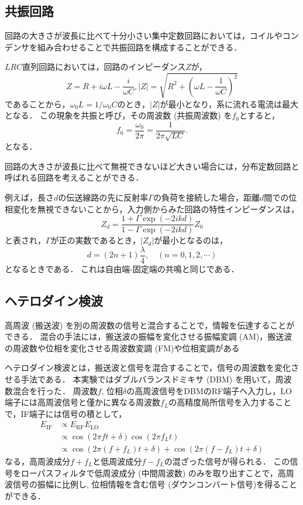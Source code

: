 \documentclass[uplatex,dvipdfmx,a4j,12pt]{jsarticle}
\begin{document}
\subsection{共振回路}
回路の大きさが波長に比べて十分小さい集中定数回路においては，コイルやコンデンサを組み合わせることで共振回路を構成することができる．

$LRC$直列回路においては，回路のインピーダンス$Z$が，
\begin{equation}
  Z = R + i\omega L - \frac{i}{\omega C}, |Z| = \sqrt{R^2 + \left(\omega L - \frac{1}{\omega C}\right)^2}
\end{equation}
であることから，$\omega_0 L = 1/\omega_0 C$のとき，$|Z|$が最小となり，系に流れる電流は最大となる．
この現象を共振と呼び，その周波数 (共振周波数) を$f_0$とすると，
\begin{equation}
  f_0 = \frac{\omega_0}{2\pi} = \frac{1}{2\pi\sqrt{LC}}.\label{eq:resonance_frequency}
\end{equation}
となる．

回路の大きさが波長に比べて無視できないほど大きい場合には，分布定数回路と呼ばれる回路を考えることができる．

例えば，長さ$d$の伝送線路の先に反射率$\Gamma$の負荷を接続した場合，距離$d$間での位相変化を無視できないことから，入力側からみた回路の特性インピーダンスは，
\begin{equation}
  Z_d = \frac{1+\Gamma \exp{(-2ikd)}}{1-\Gamma \exp{(-2ikd)}}Z_0
\end{equation}
と表され，$\Gamma$が正の実数であるとき，$|Z_d|$が最小となるのは，
\begin{equation}
  d = (2n + 1)\frac{\lambda}{4}, \quad (n = 0, 1, 2, \cdots)\label{eq:resonance_length}
\end{equation}
となるときである．
これは自由端-固定端の共鳴と同じである．

\subsection{ヘテロダイン検波}
高周波 (搬送波) を別の周波数の信号と混合することで，情報を伝達することができる．
混合の手法には，搬送波の振幅を変化させる振幅変調 (AM)，搬送波の周波数や位相を変化させる周波数変調 (FM)や位相変調がある

ヘテロダイン検波とは，搬送波と信号を混合することで，信号の周波数を変化させる手法である．
本実験ではダブルバランスドミキサ (DBM) を用いて，周波数混合を行った．
周波数$f$, 位相$\delta$の高周波信号をDBMのRF端子へ入力し，LO端子には高周波信号と僅かに異なる周波数$f_L$の高精度局所信号を入力することで，IF端子には信号の積として，
\begin{align}
  E_\mathrm{IF} &\propto E_\mathrm{RF} E_\mathrm{LO} \nonumber \\
  &\propto \cos\left(2\pi f t + \delta\right) \cos\left(2\pi f_L t\right) \nonumber \\
  &\propto \cos\left(2\pi (f + f_L) t + \delta\right) + \cos\left(2\pi (f - f_L) t + \delta\right)
\end{align}
なる，高周波成分$f + f_L$と低周波成分$f - f_L$の混ざった信号が得られる．
この信号をローパスフィルタで低周波成分 (中間周波数) のみを取り出すことで，高周波信号の振幅に比例し, 位相情報を含む信号 (ダウンコンバート信号)を得ることができる．
\end{document}
